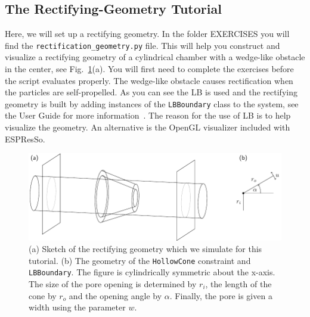 \documentclass[aip,jcp,reprint,a4paper,onecolumn,amsmath]{revtex4-1}
\newcommand\code{\lstinline}
\newcommand{\es}{\mbox{\textsf{ESPResSo}}\xspace}
\newcommand\codees{\lstinline[language=python]}
\begin{document}
\subsection{\label{sub:rgtut}The Rectifying-Geometry Tutorial}

Here, we will set up a rectifying geometry. In the folder EXERCISES you will
find the \code{rectification_geometry.py} file. This will help you construct
and visualize a rectifying geometry of a cylindrical chamber with a wedge-like
obstacle in the center, see Fig.~\ref{fig:system}(a). You will first need to
complete the exercises before the script evaluates properly. The wedge-like
obstacle causes rectification when the particles are self-propelled. As you can
see the LB is used and the rectifying geometry is built by adding instances of
the \codees{LBBoundary} class to the system, see the User Guide for more
information~\cite{UG}. The reason for the use of LB is to help visualize the
geometry. An alternative is the OpenGL visualizer included with \es{}.

\begin{figure}[!htb]
\begin{center}
\includegraphics[scale=1.0]{FIGURES/geometry}
\end{center}
\caption{\label{fig:system}(a) Sketch of the rectifying geometry which we
simulate for this tutorial. (b) The geometry of the \codees{HollowCone}
constraint and \codees{LBBoundary}. The figure is cylindrically symmetric about
the x-axis. The size of the pore opening is determined by $r_{i}$, the length
of the cone by $r_{o}$ and the opening angle by $\alpha$. Finally, the pore is
given a width using the parameter $w$.}
\end{figure}
\end{document}
